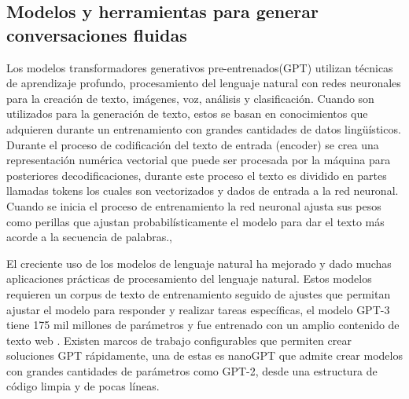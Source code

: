 \subsection{Modelos y herramientas para generar conversaciones fluidas}\label{section: Revisión de la literatura}
Los modelos transformadores generativos pre-entrenados(GPT) utilizan técnicas de aprendizaje profundo, procesamiento del lenguaje natural con redes neuronales   para la creación de texto, imágenes, voz, análisis y clasificación. Cuando son utilizados para la generación de texto, estos se basan en conocimientos que adquieren durante un entrenamiento con grandes cantidades de datos lingüísticos. 
Durante el proceso de codificación del texto de entrada (encoder) se crea una representación numérica vectorial que puede ser procesada por la máquina para posteriores decodificaciones, durante este proceso el texto es dividido en partes llamadas tokens los cuales son vectorizados y dados de entrada a la red neuronal.
Cuando se inicia el proceso de entrenamiento la red neuronal ajusta sus pesos como perillas que ajustan probabilísticamente el modelo para dar el texto más acorde a la secuencia de palabras.\cite{Alex2023}, \cite{AWS2022}

El creciente uso de los modelos de lenguaje natural ha mejorado y dado muchas aplicaciones prácticas de procesamiento del lenguaje natural. Estos modelos requieren un corpus de texto de entrenamiento seguido de ajustes que permitan ajustar el modelo para responder y realizar tareas específicas, el modelo GPT-3 tiene 175 mil millones de parámetros y fue entrenado con un amplio contenido de texto web \cite{Brown2020}. 
Existen marcos de trabajo configurables que permiten crear soluciones GPT rápidamente, una de estas es nanoGPT que admite crear modelos con grandes cantidades de parámetros como GPT-2, desde una estructura de código limpia y de pocas líneas. 
